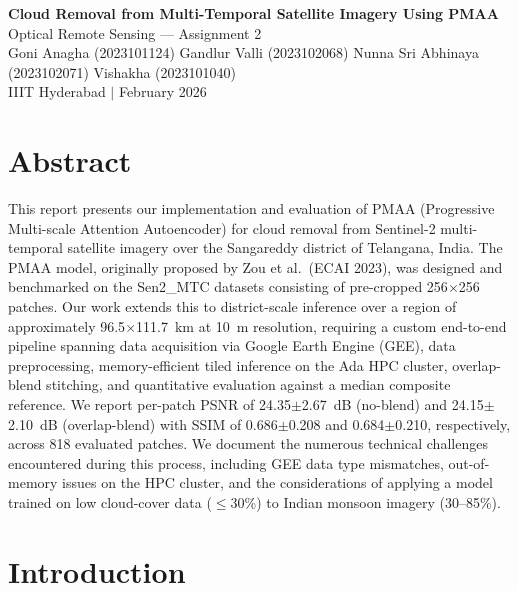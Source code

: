 \documentclass[12pt,a4paper]{article}
\begin{document}
\begin{center}
{\Large\textbf{Cloud Removal from Multi-Temporal Satellite Imagery Using PMAA}}\\[0.3cm]
{\normalsize Optical Remote Sensing --- Assignment 2}\\[0.3cm]
{\normalsize
Goni Anagha (2023101124) \quad Gandlur Valli (2023102068) \quad Nunna Sri Abhinaya (2023102071) \quad Vishakha (2023101040)}\\[0.2cm]
{\small IIIT Hyderabad \quad $\mid$ \quad February 2026}
\end{center}
\vspace{0.5cm}


\section{Abstract}

This report presents our implementation and evaluation of PMAA (Progressive Multi-scale Attention Autoencoder) for cloud removal from Sentinel-2 multi-temporal satellite imagery over the Sangareddy district of Telangana, India. The PMAA model, originally proposed by Zou et al.\ (ECAI 2023), was designed and benchmarked on the Sen2\_MTC datasets consisting of pre-cropped 256$\times$256 patches. Our work extends this to district-scale inference over a region of approximately 96.5$\times$111.7~km at 10~m resolution, requiring a custom end-to-end pipeline spanning data acquisition via Google Earth Engine (GEE), data preprocessing, memory-efficient tiled inference on the Ada HPC cluster, overlap-blend stitching, and quantitative evaluation against a median composite reference. We report per-patch PSNR of 24.35$\pm$2.67~dB (no-blend) and 24.15$\pm$2.10~dB (overlap-blend) with SSIM of 0.686$\pm$0.208 and 0.684$\pm$0.210, respectively, across 818 evaluated patches. We document the numerous technical challenges encountered during this process, including GEE data type mismatches, out-of-memory issues on the HPC cluster, and the considerations of applying a model trained on low cloud-cover data ($\leq$30\%) to Indian monsoon imagery (30--85\%).



\section{Introduction}
\end{document}
